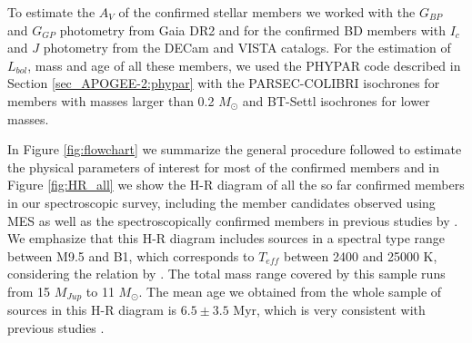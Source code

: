 \documentclass[12pt]{article}
\begin{document}
To estimate the $A_V$ of the confirmed stellar members we worked with the $G_{BP}$ and $G_{GP}$ photometry from Gaia DR2 and for the confirmed BD members with $I_c$ and $J$ photometry from the DECam and VISTA catalogs. For the estimation of $L_{bol}$, mass and age of all these members, we used the PHYPAR code described in Section \ref{sec_APOGEE-2:phypar} with the PARSEC-COLIBRI isochrones for members with masses larger than 0.2 $M_\odot$ and BT-Settl isochrones for lower masses. 

In Figure \ref{fig:flowchart} we summarize the general procedure followed to estimate the physical parameters of interest for most of the confirmed members and in Figure \ref{fig:HR_all} we show the H-R diagram of all the so far confirmed members in our spectroscopic survey, including the member candidates observed using MES as well as the spectroscopically confirmed members in previous studies by \citet{Briceno2005,Briceno2007,Downes2014,Downes2015,Briceno2018}. We emphasize that this H-R diagram includes sources in a spectral type range between M9.5 and B1, which corresponds to $T_{eff}$ between 2400 and 25000 K, considering the relation by \citet{Pecaut2013}. The total mass range covered by this sample runs from 15 $M_{Jup}$ to 11 $M_\odot$. The mean age we obtained from the whole sample of sources in this H-R diagram is $6.5\pm3.5$ Myr, which is very consistent with previous studies \citep[6.1$\pm$2.4; ][ and references therein]{Briceno2018}.
\end{document}
